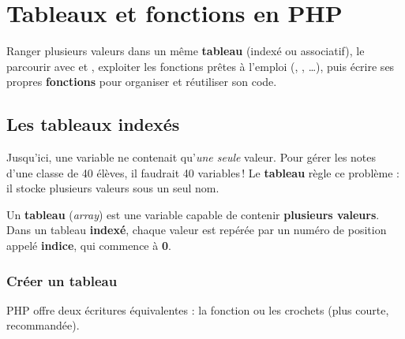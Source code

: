 \chapter{Tableaux et fonctions en PHP}

\begin{synthese}[Au programme]
Ranger plusieurs valeurs dans un même \textbf{tableau} (indexé ou associatif),
le parcourir avec  et , exploiter les fonctions prêtes à
l'emploi (, , \dots), puis écrire ses
propres \textbf{fonctions} pour organiser et réutiliser son code.
\end{synthese}

\section{Les tableaux indexés}

Jusqu'ici, une variable ne contenait qu'\emph{une seule} valeur. Pour gérer les
notes d'une classe de 40 élèves, il faudrait 40 variables\,! Le \textbf{tableau}
règle ce problème : il stocke plusieurs valeurs sous un seul nom.

\begin{definition}
Un \textbf{tableau} (\emph{array}) est une variable capable de contenir
\textbf{plusieurs valeurs}. Dans un tableau \textbf{indexé}, chaque valeur est
repérée par un numéro de position appelé \textbf{indice}, qui commence à
\textbf{0}.
\end{definition}

\subsection{Créer un tableau}

PHP offre deux écritures équivalentes : la fonction  ou les
crochets \code{[]} (plus courte, recommandée).


\begin{syntaxe}
\end{syntaxe}

